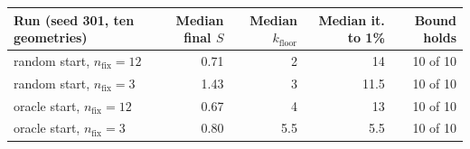 \begin{tabular}{@{}lrrrr@{}}
\toprule
Run (seed 301, ten geometries) & Median final $S$ & Median $k_{\mathrm{floor}}$ & Median it. to 1\% & Bound holds \\
\midrule
random start, $n_{\mathrm{fix}}=12$ & 0.71 & 2 & 14 & 10 of 10 \\
random start, $n_{\mathrm{fix}}=3$ & 1.43 & 3 & 11.5 & 10 of 10 \\
oracle start, $n_{\mathrm{fix}}=12$ & 0.67 & 4 & 13 & 10 of 10 \\
oracle start, $n_{\mathrm{fix}}=3$ & 0.80 & 5.5 & 5.5 & 10 of 10 \\
\bottomrule
\end{tabular}

